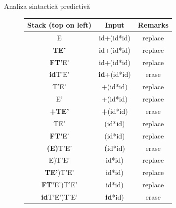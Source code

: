\documentclass[pdf]{beamer}
\begin{document}
\begin{frame}{Analiza sintactică predictivă}
\begin{figure}
\begin{table}[H]
\begin{tabular}{c | c | c }

Stack (top on left) & Input & Remarks \\
\hline
E & id+(id*id) & replace \\
\hline
\textbf{TE'} & id+(id*id) &  replace \\
\hline
\textbf{FT'}E' & id+(id*id) & replace \\
\hline
\textbf{id}T'E'& \textbf{id}+(id*id) & erase\\
\hline
T'E' & +(id*id) &  replace\\
\hline
E' & +(id*id) & replace \\
\hline
\textbf{+TE'} & \textbf{+}(id*id) &erase \\
\hline
TE' & (id*id) & replace \\
\hline
\textbf{FT'}E' & (id*id) & replace \\
\hline
\textbf{(E)}T'E' &\textbf{(}id*id) & erase \\
\hline
E)T'E'& id*id) & replace \\
\hline
\textbf{TE'})T'E'& id*id) & replace \\
\hline
\textbf{FT'}E')T'E'& id*id) & replace \\
\hline
\textbf{id}T'E')T'E'& \textbf{id}*id) & erase \\
\hline

\end{tabular}
\end{table}
\end{figure}
\end{frame}
\end{document}
